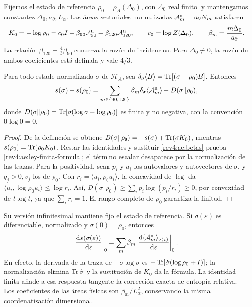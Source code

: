 Fijemos el estado de referencia \(\rho_0=\rho_A(\Delta_0)\), con
\(\Delta_0\) real finito, y mantengamos constantes
\(\Delta_0,a_\partial,L_\alpha\). Las áreas sectoriales
normalizadas \(\mathcal A_m^{\rm n}=a_\partial N_m\) satisfacen
\begin{equation}
 K_0=-\log\rho_0=c_0I+
 \beta_{90}\mathcal A_{90}^{\rm n}
 +\beta_{120}\mathcal A_{120}^{\rm n},
 \qquad c_0=\log Z(\Delta_0),\qquad
 \beta_m=\frac{m\Delta_0}{a_\partial}.
 \label{rev4:ae:betas}
\end{equation}
La relación \(\beta_{120}=\tfrac43\beta_{90}\) conserva la razón
de incidencias. Para \(\Delta_0\ne0\), la razón de ambos coeficientes
está definida y vale \(4/3\).

\begin{theorem}
\label{rev4:ae:ley-finita}
Para todo estado normalizado \(\sigma\) de \(\mathscr H_A\), sea
\(\delta_\sigma\langle B\rangle=\operatorname{Tr}[(\sigma-\rho_0)B]\).
Entonces
\begin{equation}
 s(\sigma)-s(\rho_0)
 =\sum_{m\in\{90,120\}}\beta_m
       \delta_\sigma\langle\mathcal A_m^{\rm n}\rangle
   -D(\sigma\Vert\rho_0),
 \label{rev4:ae:ley-finita-formula}
\end{equation}
donde \(D(\sigma\Vert\rho_0)=
\operatorname{Tr}[\sigma(\log\sigma-\log\rho_0)]\) es finita y no negativa,
con la convención \(0\log0=0\).
\end{theorem}
\begin{proof}
De la definición se obtiene
\(D(\sigma\Vert\rho_0)=-s(\sigma)+\operatorname{Tr}(\sigma K_0)\),
mientras \(s(\rho_0)=\operatorname{Tr}(\rho_0K_0)\). Restar las identidades
y sustituir \eqref{rev4:ae:betas} prueba
\eqref{rev4:ae:ley-finita-formula}; el término escalar desaparece
por la normalización de las trazas. Para la positividad, sean \(p_i\)
y \(u_i\) los autovalores y autovectores de \(\sigma\), y
\(q_j>0,v_j\) los de \(\rho_0\). Con
\(r_i=\langle u_i,\rho_0u_i\rangle\), la concavidad de
\(\log\) da
\(\langle u_i,\log\rho_0u_i\rangle\le\log r_i\).
Así, \(D(\sigma\Vert\rho_0)\ge\sum_i p_i\log(p_i/r_i)\ge0\),
por convexidad de \(t\log t\), ya que \(\sum_i r_i=1\).
El rango completo de \(\rho_0\) garantiza la finitud.
\end{proof}

Su versión infinitesimal mantiene fijo el estado de referencia. Si
\(\sigma(\varepsilon)\) es diferenciable, normalizado y
\(\sigma(0)=\rho_0\), entonces
\[
 \left.\frac{\mathrm d s(\sigma(\varepsilon))}{\mathrm d\varepsilon}\right|_0
 =\sum_m\beta_m
  \left.\frac{\mathrm d\langle\mathcal A_m^{\rm n}\rangle_{
                          \sigma(\varepsilon)}}{\mathrm d\varepsilon}\right|_0.
\]
En efecto, la derivada de la traza de \(-\sigma\log\sigma\) es
\(-\operatorname{Tr}[\dot\sigma(\log\rho_0+I)]\); la normalización elimina
\(\operatorname{Tr}\dot\sigma\) y la sustitución de \(K_0\) da la fórmula.
La identidad finita añade a esa respuesta tangente la corrección exacta
de entropía relativa. Los coeficientes de las áreas físicas son
\(\beta_m/L_\alpha^2\), conservando la misma coordenatización dimensional.

